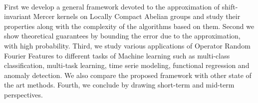 \paragraph{}
First we develop a general framework devoted to the approximation of shift-invariant Mercer kernels on Locally Compact Abelian groups and study their properties along with the complexity of the algorithms based on them. Second we show theoretical guarantees by bounding the error due to the approximation, with high probability. Third, we study various applications of Operator Random Fourier Features to different tasks of Machine learning such as multi-class classification, multi-task learning, time serie modeling, functional regression and anomaly detection. We also compare the proposed framework with other state of the art methods. Fourth, we conclude by drawing short-term and mid-term perspectives.

\endgroup

\vfill
